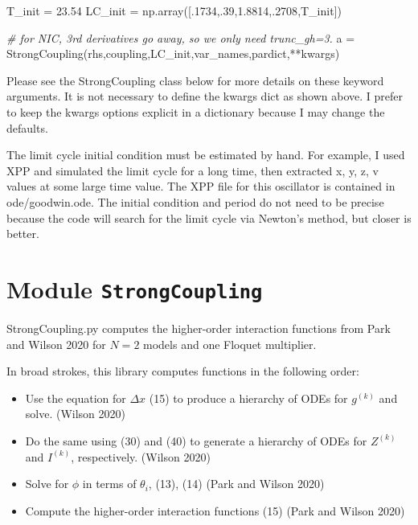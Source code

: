 \documentclass[
  english,
  a4paper,
  oneside]{article}
\newenvironment{Shaded}{}{}
\newcommand{\CommentTok}[1]{\textcolor[rgb]{0.38,0.63,0.69}{\textit{#1}}}
\newcommand{\DecValTok}[1]{\textcolor[rgb]{0.25,0.63,0.44}{#1}}
\newcommand{\FloatTok}[1]{\textcolor[rgb]{0.25,0.63,0.44}{#1}}
\newcommand{\NormalTok}[1]{#1}
\newcommand{\OperatorTok}[1]{\textcolor[rgb]{0.40,0.40,0.40}{#1}}
\providecommand{\tightlist}{%
  \setlength{\itemsep}{0pt}\setlength{\parskip}{0pt}}
\begin{document}
\begin{Shaded}
\begin{Highlighting}[]
\NormalTok{    T_init }\OperatorTok{=} \FloatTok{23.54}
\NormalTok{    LC_init }\OperatorTok{=}\NormalTok{ np.array([.}\DecValTok{1734}\NormalTok{,.}\DecValTok{39}\NormalTok{,}\FloatTok{1.8814}\NormalTok{,.}\DecValTok{2708}\NormalTok{,T_init])}
    
    \CommentTok{# for NIC, 3rd derivatives go away, so we only need trunc_gh=3.}
\NormalTok{    a }\OperatorTok{=}\NormalTok{ StrongCoupling(rhs,coupling,LC_init,var_names,pardict,}\OperatorTok{**}\NormalTok{kwargs)}
\end{Highlighting}
\end{Shaded}

Please see the StrongCoupling class below for more details on these
keyword arguments. It is not necessary to define the kwargs dict as
shown above. I prefer to keep the kwargs options explicit in a
dictionary because I may change the defaults.

The limit cycle initial condition must be estimated by hand. For
example, I used XPP and simulated the limit cycle for a long time, then
extracted x, y, z, v values at some large time value. The XPP file for
this oscillator is contained in ode/goodwin.ode. The initial condition
and period do not need to be precise because the code will search for
the limit cycle via Newton's method, but closer is better.

\hypertarget{StrongCoupling}{%
\section{\texorpdfstring{Module
\texttt{StrongCoupling}}{Module StrongCoupling}}\label{StrongCoupling}}

StrongCoupling.py computes the higher-order interaction functions from
Park and Wilson 2020 for \(N=2\) models and one Floquet multiplier.

In broad strokes, this library computes functions in the following
order:

\begin{itemize}
\tightlist
\item
  Use the equation for \(\Delta x\) (15) to produce a hierarchy of ODEs
  for \(g^{(k)}\) and solve. (Wilson 2020)
\item
  Do the same using (30) and (40) to generate a hierarchy of ODEs for
  \(Z^{(k)}\) and \(I^{(k)}\), respectively. (Wilson 2020)
\item
  Solve for \(\phi\) in terms of \(\theta_i\), (13), (14) (Park and
  Wilson 2020)
\item
  Compute the higher-order interaction functions (15) (Park and Wilson
  2020)
\end{itemize}
\end{document}
